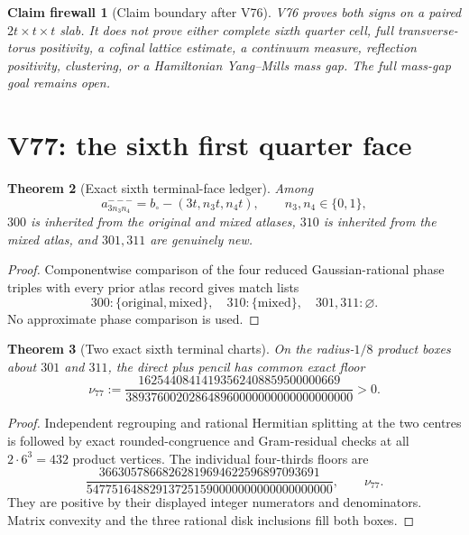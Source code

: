 \documentclass[11pt,oneside]{article}
\newtheorem{theorem}{Theorem}[section]
\newtheorem{firewall}[theorem]{Claim firewall}
\theoremstyle{definition}
\theoremstyle{remark}
\begin{document}
\begin{firewall}[Claim boundary after V76]
\label{fire:newv76-final}
V76 proves both signs on a paired \(2t\times t\times t\) slab.  It
does not prove either complete sixth quarter cell, full
transverse-torus positivity, a cofinal lattice estimate, a
continuum measure, reflection positivity, clustering, or a
Hamiltonian Yang--Mills mass gap.  The full mass-gap goal remains
open.
\end{firewall}

\section{V77: the sixth first quarter face}
\label{sec:newv77-sixth-first-face}

\begin{theorem}[Exact sixth terminal-face ledger]
\label{thm:newv77-intersections}
Among
\[
 a^{---}_{3n_3n_4}=b_\circ-(3t,n_3t,n_4t),
 \qquad n_3,n_4\in\{0,1\},                              \tag{77.1}
\]
\(300\) is inherited from the original and mixed atlases, \(310\)
is inherited from the mixed atlas, and \(301,311\) are genuinely
new.
\end{theorem}

\begin{proof}
Componentwise comparison of the four reduced Gaussian-rational
phase triples with every prior atlas record gives match lists
\[
 300:\{\mathrm{original},\mathrm{mixed}\},\quad
 310:\{\mathrm{mixed}\},\quad301,311:\varnothing.       \tag{77.2}
\]
No approximate phase comparison is used.
\end{proof}

\begin{theorem}[Two exact sixth terminal charts]
\label{thm:newv77-two-charts}
On the radius-\(1/8\) product boxes about \(301\) and \(311\), the
direct plus pencil has common exact floor
\[
 \nu_{77}:=
 \frac{16254408414193562408859500000669}
 {389376002028648960000000000000000000}>0.             \tag{77.3}
\]
\end{theorem}

\begin{proof}
Independent regrouping and rational Hermitian splitting at the two
centres is followed by exact rounded-congruence and Gram-residual
checks at all \(2\cdot6^3=432\) product vertices.  The individual
four-thirds floors are
\[
 \frac{36630578668262819694622596897093691}
 {547751648829137251590000000000000000000},
 \qquad \nu_{77}.                                      \tag{77.4}
\]
They are positive by their displayed integer numerators and
denominators.  Matrix convexity and the three rational disk
inclusions fill both boxes.
\end{proof}
\end{document}
